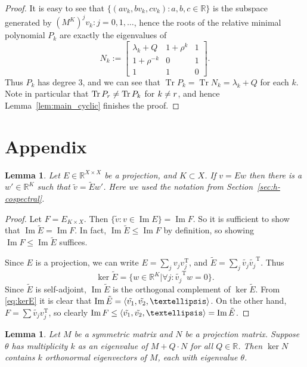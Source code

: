 \documentclass[11pt]{article}
\newtheorem{lemma}[theo]{Lemma}
\theoremstyle{definition}
\numberwithin{equation}{section}
\newcommand\+{\mkern2mu}
\newcommand{\R}{\mathbb{R}}
\newcommand{\1}{\mathbf 1}
\newcommand{\tr}{\mathrm{T}}
\DeclareMathOperator{\Tr}{Tr}
\DeclareMathOperator{\im}{Im}
\DeclarePairedDelimiter{\sprod}{\langle}{\rangle}
\begin{document}
\begin{proof}
It is easy to see that $\{ (a v_k, b v_k, c v_k) : a,b,c \in \R\}$ is the subspace generated by $(M^K)^j v_k : j = 0,1, \dots$, hence the roots of the relative minimal polynomial $P_k$ are exactly the eigenvalues of 
\[
N_k:=\begin{bmatrix}\lambda_k+Q&1+\rho^k&1\\1+\rho^{-k}&0&1\\1&1&0\end{bmatrix}.
\]
 Thus $P_k$ has degree 3, and we can see that $\Tr P_k = \Tr N_k = \lambda_k+Q$ for each $k$. Note in particular that $\Tr P_\ord \neq \Tr P_k$ for $k\neq r$, and hence Lemma~\ref{lem:main_cyclic} finishes the proof. 
\end{proof}
 
\section{Appendix}

\begin{lemma}\label{lem:imE}
Let $E \in \R^{X\times X}$ be a projection, and $K\subset X$. If $v = E w$ then there is a $w' \in \R^K$ such that $\tilde{v} = \tilde{E} w'$. Here we used the notation from Section~\ref{sec:h-cospectral}.
\end{lemma}

\begin{proof}
Let $F = E_{K \times X}$. Then $\{ \tilde{v} : v \in \im E\} = \im F$. So it is sufficient to show that $\im \tilde{E} = \im F$. In fact, $\im \tilde{E} \leq \im F$ by definition, so showing $\im F \leq \im \tilde{E}$ suffices.

Since $E$ is a projection, we can write $E = \sum_j v_j v_j^{\tr}$, and $\tilde{E} = \sum_j \tilde{v_j} \tilde{v_j}^{\tr}$. Thus \begin{equation}\label{eq:kerE}
\ker \tilde{E} = \{ w \in \R^K | \forall j: \tilde{v_j}^{\tr} w = 0\}.\end{equation} Since $\tilde{E}$ is self-adjoint, $\im \tilde{E}$ is the orthogonal complement of $\ker \tilde{E}$. From \eqref{eq:kerE} it is clear that $\im \tilde{E} = \sprod{\tilde{v_1}, \tilde{v_2}, \dots}$. On the other hand, $F = \sum \tilde{v_j} v_j^{\tr}$, so clearly $\im F \leq  \sprod{\tilde{v_1}, \tilde{v_2}, \dots} = \im \tilde{E}$.
\end{proof}

\begin{lemma}\label{lem:vanishing}
Let $M$ be a symmetric matrix and $N$ be a projection matrix. Suppose $\theta$ has multiplicity $k$ as an eigenvalue of $M+ Q \cdot N$ for all $Q \in \R$. Then $\ker N$ contains $k$ orthonormal eigenvectors of $M$, each with eigenvalue $\theta$.
\end{lemma}
\end{document}
